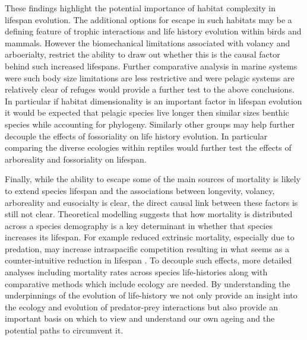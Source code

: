 


These findings highlight the potential importance of habitat complexity in lifespan evolution. The additional options for escape in such habitats may be a defining feature of trophic interactions and life history evolution within birds and mammals. However the biomechanical limitations associated with volancy and arboerialty, restrict the ability to draw out whether this is the causal factor behind such increased lifespans. Further comparative analysis in marine systems were such body size limitations are less restrictive and were pelagic systems are relatively clear of refuges would provide a further test to the above conclusions. In particular if habitat dimensionality is an important factor in lifespan evolution it would be expected that pelagic species live longer then similar sizes benthic species while accounting for phylogeny. Similarly other groups may help further decouple the effects of fossoriality on life history evolution. In particular comparing the diverse ecologies within reptiles would further test the effects of arboreality and fossoriality on lifespan.

Finally, while the ability to escape some of the main sources of mortality is likely to extend species lifespan and the associations between longevity, volancy, arboreality and eusocialty is clear, the direct causal link between these factors is still not clear. Theoretical modelling suggests that how mortality is distributed across a species demography is a key determinant in whether that species increases its lifespan. For example reduced extrinsic mortality, especially due to predation, may increase intraspacific competition resulting in what seems as a counter-intuitive reduction in lifespan \citep{moorad2010evolution}. To decouple such effects, more detailed analyses including mortality rates across species life-histories along with comparative methods which include ecology are needed. By understanding the underpinnings of the evolution of life-history we not only provide an insight into the ecology and evolution of predator-prey interactions but also provide an important basis on which to view and understand our own ageing and the potential paths to circumvent it.



%
%


